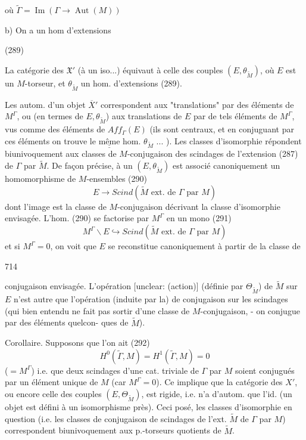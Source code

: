 où $\tilde{\Gamma} = \operatorname{Im}(\Gamma \to \operatorname{Aut}(M))$

b) On a un hom d'extensions

(289)

La catégorie des $\mathfrak{X}'$ (à un iso...) équivaut à celle des couples $(E, \theta_{\tilde{M}})$, où $E$ est un $M$-torseur, et $\theta_{\tilde{M}}$ un hom. d'extensions (289).

\newpage


Les autom. d'un objet $\overline{X}'$ correspondent
aux "translations" par des éléments
de $M^\Gamma$, ou (en termes de $E, \theta_{\tilde{M}}$)
aux translations de $E$ par de tels
éléments de $M^\Gamma$, vus comme des
éléments de $Aff_\Gamma(E)$ (ils sont centraux,
et en conjuguant par ces éléments on
trouve le $\underline{\underline{\text{même}}}$ hom. $\theta_{\tilde{M}}$ ... ). Les classes
d'isomorphie répondent
biunivoquement aux classes de $M$-conjugaison
des scindages de l'extension (287) de
$\Gamma$ par $\tilde{M}$. De façon précise, à un
$(E, \theta_{\tilde{M}})$ est associé canoniquement un
homomorphisme de $M$-ensembles
(290) $$E \to Scind(\tilde{M} \text{ ext. de } \Gamma \text{ par } M)$$
dont l'image est la classe de $M$-conjugaison
décrivant la classe d'isomorphie envisagée.
L'hom. (290) se factorise par $M^\Gamma$ en
un mono
(291) $$M^\Gamma \backslash E \hookrightarrow Scind(\tilde{M} \text{ ext. de } \Gamma \text{ par } M)$$
et si $M^\Gamma = 0$, on voit que $E$ se reconstitue
canoniquement à partir de la classe de

\newpage


714

conjugaison envisagée. L'opération [unclear: (action)]
(définie par $\Theta_{\tilde{M}}$)
de $\tilde{M}$ sur $E$ n'est autre que l'opération
(induite par la)
de conjugaison sur les scindages
(qui bien entendu ne fait pas sortir
d'une classe de $M$-conjugaison, - on
conjugue par des éléments quelcon-
ques de $\tilde{M}$).

Corollaire. Supposons que l'on ait
(292) $$H^0(\tilde{\Gamma}, M) = H^1(\tilde{\Gamma}, M) = 0$$
($= M^\Gamma$)
i.e. que deux scindages d'une cat.
triviale de $\Gamma$ par $M$ soient conjugués
par un élément unique de $M$ (car $M^\Gamma = 0$). Ce
implique que la catégorie des $X'$, ou
encore celle des couples $(E, \Theta_{\tilde{M}})$, est
rigide, i.e. n'a d'autom. que l'id. (un objet est défini à un 
isomorphisme près). Ceci posé, les classes
d'isomorphie en question (i.e. les classes
de conjugaison de scindages de
l'ext. $\tilde{M}$ de $\Gamma$ par $M$) correspondent
biunivoquement aux p.-torseurs quotients de $\tilde{M}$.

